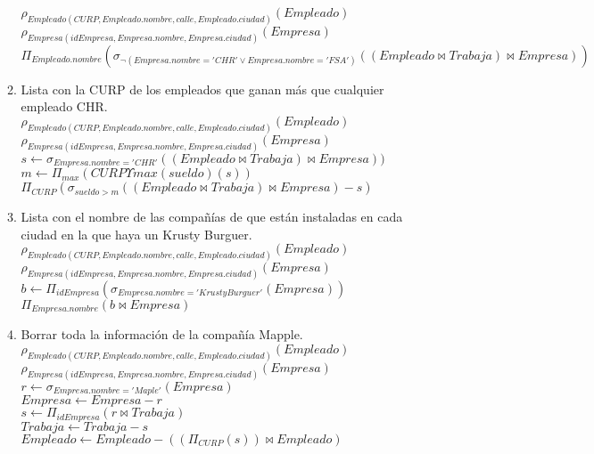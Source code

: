 \documentclass{article}
\begin{document}
\begin{enumerate}
\begin{enumerate}
				$\rho_{Empleado(CURP, Empleado.nombre, calle, Empleado.ciudad)}(Empleado)$\\
				$\rho_{Empresa(idEmpresa, Empresa.nombre, Empresa.ciudad)}(Empresa)$\\
				$\Pi_{Empleado.nombre}(\sigma_{\lnot(Empresa.nombre = 'CHR' \lor Empresa.nombre = 'FSA')}((Empleado \bowtie Trabaja) \bowtie Empresa))$\\
				
				\item Lista con la CURP de los empleados que ganan más que cualquier empleado CHR.\\
				
				$\rho_{Empleado(CURP, Empleado.nombre, calle, Empleado.ciudad)}(Empleado)$\\
				$\rho_{Empresa(idEmpresa, Empresa.nombre, Empresa.ciudad)}(Empresa)$\\
				$s \leftarrow \sigma_{Empresa.nombre = 'CHR'}((Empleado \bowtie Trabaja) \bowtie Empresa))$\\
				$m \leftarrow \Pi_{max}(CURP \Upsilon max(sueldo)(s))$\\
				$\Pi_{CURP}(\sigma_{sueldo > m}((Empleado \bowtie Trabaja) \bowtie Empresa) - s)$\\
				
				\item Lista con el nombre de las compañías de que están instaladas en cada ciudad en la que haya
				un Krusty Burguer.\\
				
				$\rho_{Empleado(CURP, Empleado.nombre, calle, Empleado.ciudad)}(Empleado)$\\
				$\rho_{Empresa(idEmpresa, Empresa.nombre, Empresa.ciudad)}(Empresa)$\\
				$b \leftarrow \Pi_{idEmpresa}(\sigma_{Empresa.nombre = 'Krusty Burguer'}(Empresa))$\\
				$\Pi_{Empresa.nombre}(b \bowtie Empresa)$\\
				
				\item Borrar toda la información de la compañía Mapple.\\
				
				$\rho_{Empleado(CURP, Empleado.nombre, calle, Empleado.ciudad)}(Empleado)$\\
				$\rho_{Empresa(idEmpresa, Empresa.nombre, Empresa.ciudad)}(Empresa)$\\
				$r \leftarrow \sigma_{Empresa.nombre = 'Maple'}(Empresa)$\\
				$Empresa \leftarrow Empresa - r$\\
				$s \leftarrow \Pi_{idEmpresa}(r \bowtie Trabaja)$\\
				$Trabaja \leftarrow Trabaja - s$\\
				$Empleado \leftarrow Empleado - ((\Pi_{CURP}(s)) \bowtie Empleado)$\\
				

\end{enumerate}
\end{enumerate}
\end{document}
